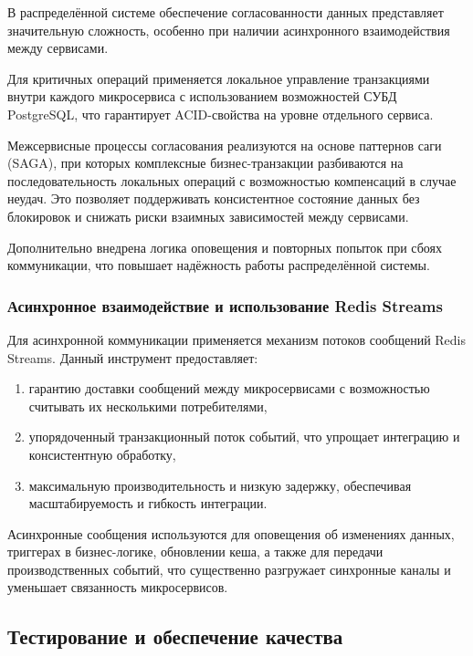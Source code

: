 \documentclass[14pt,a4paper]{extarticle}
\begin{document}
В распределённой системе обеспечение согласованности данных представляет значительную сложность, особенно при наличии асинхронного взаимодействия между сервисами.  

Для критичных операций применяется локальное управление транзакциями внутри каждого микросервиса с использованием возможностей СУБД PostgreSQL, что гарантирует ACID-свойства на уровне отдельного сервиса.  

Межсервисные процессы согласования реализуются на основе паттернов саги (SAGA), при которых комплексные бизнес-транзакции разбиваются на последовательность локальных операций с возможностью компенсаций в случае неудач. Это позволяет поддерживать консистентное состояние данных без блокировок и снижать риски взаимных зависимостей между сервисами.

Дополнительно внедрена логика оповещения и повторных попыток при сбоях коммуникации, что повышает надёжность работы распределённой системы.

\subsubsection{Асинхронное взаимодействие и использование Redis Streams}

Для асинхронной коммуникации применяется механизм потоков сообщений Redis Streams. Данный инструмент предоставляет:

\begin{enumerate}
\item гарантию доставки сообщений между микросервисами с возможностью считывать их несколькими потребителями,

\item упорядоченный транзакционный поток событий, что упрощает интеграцию и консистентную обработку,

\item максимальную производительность и низкую задержку, обеспечивая масштабируемость и гибкость интеграции.
\end{enumerate}

Асинхронные сообщения используются для оповещения об изменениях данных, триггерах в бизнес-логике, обновлении кеша, а также для передачи производственных событий, что существенно разгружает синхронные каналы и уменьшает связанность микросервисов.

\subsection{Тестирование и обеспечение качества}
\end{document}
